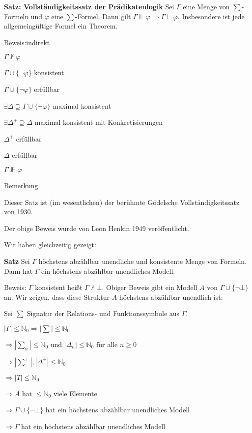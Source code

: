 \documentclass[a4paper]{article}
\renewcommand{\note}[2]{\begin{noteBox} \textbf{#1} #2 \end{noteBox}}
\begin{document}
\begin{multicols}{3}
  \note{Satz: Vollständigkeitssatz der Prädikatenlogik }{Sei $\Gamma$ eine Menge von $\sum$-Formeln und $\varphi$ eine $\sum$-Formel. Dann gilt $\Gamma\Vdash\varphi \Rightarrow \Gamma\vdash\varphi$.
    Insbesondere ist jede allgemeingültige Formel ein Theorem.}

  Beweis:indirekt
  \begin{itemize*}
    \item $\Gamma\not\vdash\varphi$
    \item $\Gamma\cup\{\lnot\varphi\}$ konsistent
    \item $\Gamma\cup\{\lnot\varphi\}$ erfüllbar
    \item $\exists\Delta\supseteq\Gamma\cup\{\lnot\varphi\}$ maximal konsistent
    \item $\exists\Delta^+\supseteq\Delta$ maximal konsistent mit Konkretisierungen
    \item $\Delta^+$ erfüllbar
    \item $\Delta$ erfüllbar
    \item $\Gamma\not\Vdash\varphi$
  \end{itemize*}

  Bemerkung
  \begin{itemize*}
    \item Dieser Satz ist (im wesentlichen) der berühmte Gödelsche Vollständigkeitssatz von 1930.
    \item Der obige Beweis wurde von Leon Henkin 1949 veröffentlicht.
  \end{itemize*}

  Wir haben gleichzeitig gezeigt:
  \note{Satz}{Sei $\Gamma$ höchstens abzählbar unendliche und konsistente Menge von Formeln. Dann hat $\Gamma$ ein höchstens abzählbar unendliches Modell.}

  Beweis: $\Gamma$ konsistent heißt $\Gamma\not\vdash\bot$. Obiger Beweis gibt ein Modell $A$ von $\Gamma\cup\{\lnot\bot\}$ an. Wir zeigen, dass diese Struktur $A$ höchstens abzählbar unendlich ist:
  \begin{itemize*}
    \item Sei $\sum$ Signatur der Relations- und Funktionssymbole aus $\Gamma$.
    \item $|\Gamma|\leq \mathbb{N}_0 \Rightarrow |\sum|\leq \mathbb{N}_0$
    \item $\Rightarrow |\sum_n|\leq \mathbb{N}_0$ und $|\Delta_n|\leq \mathbb{N}_0$ für alle $n\geq 0$
    \item $\Rightarrow |\sum^+|,|\Delta^+| \leq\mathbb{N}_0$
    \item $\Rightarrow |T| \leq\mathbb{N}_0$
    \item $\Rightarrow A$ hat $\leq\mathbb{N}_0$ viele Elemente
    \item $\Rightarrow \Gamma\cup\{\lnot\bot\}$ hat ein höchstens abzählbar unendliches Modell
    \item $\Rightarrow \Gamma$ hat ein höchstens abzählbar unendliches Modell
  \end{itemize*}


\end{multicols}
\end{document}
